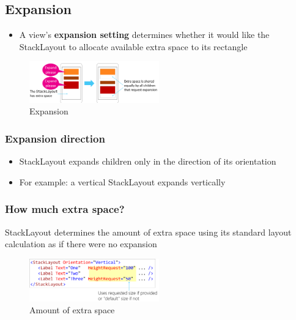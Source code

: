 \documentclass{article}
\newcommand{\bold}[1]{\textbf{#1}}
\begin{document}
\subsection{Expansion}

\begin{itemize}
    \item A view's \bold{expansion setting} determines whether it would like the StackLayout to allocate available extra space to its rectangle
\end{itemize}

\begin{figure}[H]
    \centering
    \includegraphics[width=0.5\textwidth]{xaml-expansion.png}
    \caption{Expansion}
\end{figure}

\subsubsection{Expansion direction}

\begin{itemize}
    \item StackLayout expands children only in the direction of its orientation
    \item For example: a vertical StackLayout expands vertically
\end{itemize}

\subsubsection{How much extra space?}

StackLayout determines the amount of extra space using its standard layout calculation as if there were no expansion

\begin{figure}[H]
    \centering
    \includegraphics[width=0.5\textwidth]{xaml-expansion-space.png}
    \caption{Amount of extra space}
\end{figure}
\end{document}
